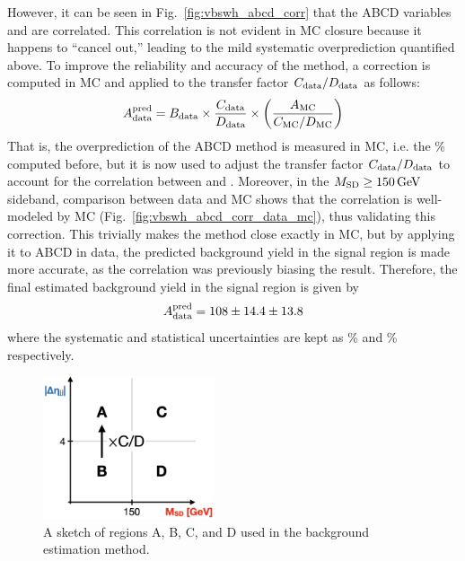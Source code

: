 However, it can be seen in Fig.~\ref{fig:vbswh_abcd_corr} that the ABCD variables \detajj and \MSD are correlated.
This correlation is not evident in MC closure because it happens to ``cancel out,'' leading to the mild systematic overprediction quantified above. 
To improve the reliability and accuracy of the method, a correction is computed in MC and applied to the transfer factor $C_{\text{data}}/D_{\text{data}}$ as follows:
\begin{equation*}
    A_{\text{data}}^\text{pred} = B_{\text{data}}\times\frac{C_{\text{data}}}{D_{\text{data}}}\times\bigg(\frac{A_{\mathrm{MC}}}{C_{\mathrm{MC}}/D_{\mathrm{MC}}}\bigg)
\end{equation*}
That is, the overprediction of the ABCD method is measured in MC, i.e. the \BkgEstTotalSystErr\% computed before, but it is now used to adjust the transfer factor $C_{\text{data}}/D_{\text{data}}$ to account for the correlation between \MSD and \detajj. 
Moreover, in the $M_{\mathrm{SD}} \geq 150\,\text{Ge\hspace{-.08em}V}$ sideband, comparison between data and MC shows that the correlation is well-modeled by MC (Fig.~\ref{fig:vbswh_abcd_corr_data_mc}), thus validating this correction. 
This trivially makes the method close exactly in MC, but by applying it to ABCD in data, the predicted background yield in the signal region is made more accurate, as the correlation was previously biasing the result.
Therefore, the final estimated background yield in the signal region is given by
\begin{equation*}
    A_{\text{data}}^{\text{pred}} = 108 \pm 14.4 \pm 13.8
\end{equation*}
where the systematic and statistical uncertainties are kept as \BkgEstTotalSystErr\% and \BkgEstStatErr\% respectively.

\begin{figure}[htb]
    \centering
    \includegraphics[width=0.45\textwidth]{fig/vbswh/abcd_cartoon.png}
    \caption{
        A sketch of regions A, B, C, and D used in the background estimation method.
    }
    \label{fig:vbswh_abcd_cartoon}
\end{figure}


